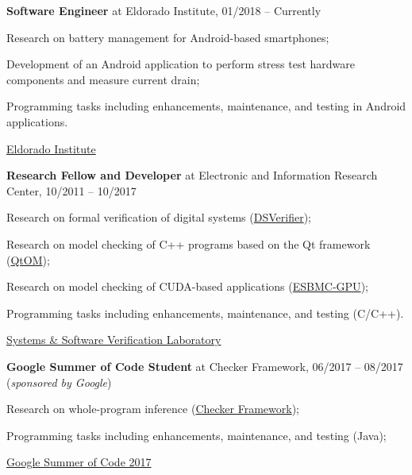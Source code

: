 \documentclass[letterpaper]{article}
\renewenvironment{itemize}{
  \begin{list}{}{
    \setlength{\leftmargin}{1.5em}
  }
}{
  \end{list}
}
\begin{document}
    \begin{enumerate}
         \item{{\bf Software Engineer} at Eldorado Institute, 01/2018 -- Currently}
      \begin{itemize}
        \item{\textendash} {Research on battery management for Android-based smartphones;}
        \item{\textendash} {Development of an Android application to perform stress test hardware components and measure current drain;}
        \item{\textendash} {Programming tasks including enhancements, maintenance, and testing in Android applications.}
        \item{\textendash} \href{http://eldorado.org.br/}{Eldorado Institute}
      \end{itemize}
     \item{{\bf Research Fellow and Developer} at Electronic and Information Research Center, 10/2011 -- 10/2017}
      \begin{itemize}
        \item{\textendash} {Research on formal verification of digital systems (\href{http://www.dsverifier.org/}{DSVerifier});}
        \item{\textendash} {Research on model checking of C++ programs based on the Qt framework (\href{http://www.esbmc/qtom/}{QtOM});}
        \item{\textendash} {Research on model checking of CUDA-based applications (\href{http://www.esbmc/gpu/}{ESBMC-GPU});}
        \item{\textendash} {Programming tasks including enhancements, maintenance, and testing (C/C++).}
        \item{\textendash} \href{https://ssvlab.github.io}{Systems \& Software Verification Laboratory}
      \end{itemize}
      \item{{\bf Google Summer of Code Student} at Checker Framework, 06/2017 -- 08/2017 ({\it sponsored by Google})} 
      \begin{itemize}
        \item{\textendash} {Research on whole-program inference (\href{https://checkerframework.org/}{Checker Framework});}
        \item{\textendash} {Programming tasks including enhancements, maintenance, and testing (Java);}
        \item{\textendash} \href{https://summerofcode.withgoogle.com/archive/2017/projects/6689181245898752/}{Google Summer of Code 2017}

\end{itemize}
\end{enumerate}
\end{document}
